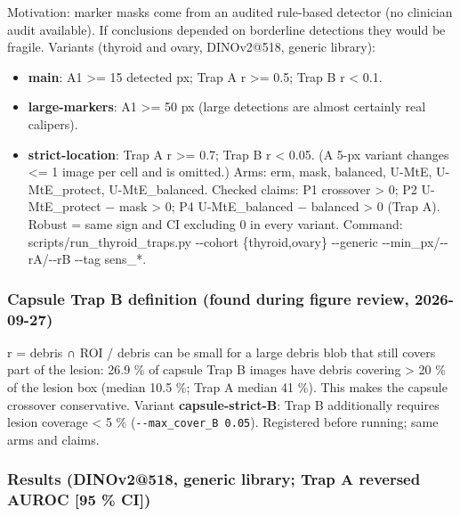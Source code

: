 {\small
Motivation: marker masks come from an audited rule-based detector (no clinician audit available). If conclusions
depended on borderline detections they would be fragile. Variants (thyroid and ovary, DINOv2@518, generic library):

\begin{itemize}

\item
  \textbf{main}: A1 \textgreater= 15 detected px; Trap A r \textgreater= 0.5; Trap B r \textless{} 0.1.
\item
  \textbf{large-markers}: A1 \textgreater= 50 px (large detections are almost certainly real calipers).
\item
  \textbf{strict-location}: Trap A r \textgreater= 0.7; Trap B r \textless{} 0.05.
  (A 5-px variant changes \textless= 1 image per cell and is omitted.)
  Arms: erm, mask, balanced, U-MtE, U-MtE\_protect, U-MtE\_balanced. Checked claims: P1 crossover \textgreater{} 0; P2 U-MtE\_protect −
  mask \textgreater{} 0; P4 U-MtE\_balanced − balanced \textgreater{} 0 (Trap A). Robust = same sign and CI excluding 0 in every variant.
  Command: scripts/run\_thyroid\_traps.py -\/-cohort \{thyroid,ovary\} -\/-generic -\/-min\_px/-\/-rA/-\/-rB -\/-tag sens\_*.
\end{itemize}

\subsubsection{Capsule Trap B definition (found during figure review, 2026-09-27)}\label{capsule-trap-b-definition-found-during-figure-review-2026-09-27}

r = \textbar debris ∩ ROI\textbar{} / \textbar debris\textbar{} can be small for a large debris blob that still covers part of the lesion: 26.9 \% of
capsule Trap B images have debris covering \textgreater{} 20 \% of the lesion box (median 10.5 \%; Trap A median 41 \%). This makes
the capsule crossover conservative. Variant \textbf{capsule-strict-B}: Trap B additionally requires lesion coverage \textless{} 5 \%
(\texttt{-\/-max\_cover\_B\ 0.05}). Registered before running; same arms and claims.

\subsubsection{Results (DINOv2@518, generic library; Trap A reversed AUROC {[}95 \% CI{]})}\label{results-dinov2518-generic-library-trap-a-reversed-auroc-95--ci}

}
